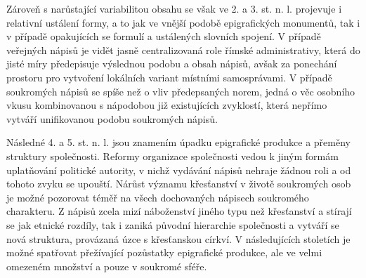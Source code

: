 Zároveň s narůstající variabilitou obsahu se však ve 2. a 3. st. n. l. projevuje i relativní ustálení formy, a to jak ve vnější podobě epigrafických monumentů, tak i v případě opakujících se formulí a ustálených slovních spojení. V případě veřejných nápisů je vidět jasně centralizovaná role římské administrativy, která do jisté míry předepisuje výslednou podobu a obsah nápisů, avšak za ponechání prostoru pro vytvoření lokálních variant místními samosprávami. V případě soukromých nápisů se spíše než o vliv předepsaných norem, jedná o věc osobního vkusu kombinovanou s nápodobou již existujících zvyklostí, která nepřímo vytváří unifikovanou podobu soukromých nápisů.

Následné 4. a 5. st. n. l. jsou znamením úpadku epigrafické produkce a přeměny struktury společnosti. Reformy organizace společnosti vedou k jiným formám uplatňování politické autority, v nichž vydávání nápisů nehraje žádnou roli a od tohoto zvyku se upouští. Nárůst významu křesťanství v životě soukromých osob je možné pozorovat téměř na všech dochovaných nápisech soukromého charakteru. Z nápisů zcela mizí náboženství jiného typu než křesťanství a stírají se jak etnické rozdíly, tak i zaniká původní hierarchie společnosti a vytváří se nová struktura, provázaná úzce s křesťanskou církví. V následujících stoletích je možné spatřovat přežívající pozůstatky epigrafické produkce, ale ve velmi omezeném množství a pouze v soukromé sféře.

